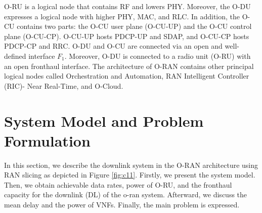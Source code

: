 \documentclass[lettersize,journal]{IEEEtran}
\begin{document}
O-RU is a logical node that contains RF and lowers PHY. Moreover, the O-DU expresses a logical node with higher PHY, MAC, and RLC.
In addition, the O-CU contains two parts: the O-CU user plane (O-CU-UP) and the O-CU control plane (O-CU-CP). O-CU-UP hosts PDCP-UP and SDAP, and O-CU-CP hosts PDCP-CP and RRC.
O-DU and O-CU are connected via an open and well-defined interface $F_1$.
Moreover, O-DU is connected to a radio unit (O-RU) with an open fronthaul interface.
The architecture of O-RAN contains other principal logical nodes called Orchestration and Automation, RAN Intelligent Controller (RIC)- Near Real-Time, and O-Cloud\cite{gavrilovska2020cloud,niknam2020intelligent,kazemifard2021minimum,both2021system,ORANArch,ORANML,lin2021toward}. 
\section{System Model and Problem Formulation}\label{systemmodel}
In this section, we describe the downlink system in the O-RAN architecture using RAN slicing as depicted in Figure \ref{fig:c11}.
Firstly, we present the system model. Then, we obtain achievable data rates, power of O-RU, and the fronthaul capacity for the downlink (DL) of the o-ran system. Afterward, we discuss the mean delay and the power of VNFs.
Finally, the main problem is expressed.
\end{document}
